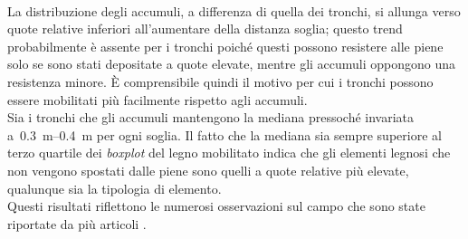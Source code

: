 %
\\
La distribuzione degli accumuli, a differenza di quella dei tronchi, si allunga verso quote relative inferiori all'aumentare della distanza soglia; questo trend probabilmente è assente per i tronchi poiché questi possono resistere alle piene solo se sono stati depositate a quote elevate, mentre gli accumuli oppongono una resistenza minore.
È comprensibile quindi il motivo per cui i tronchi possono essere mobilitati più facilmente rispetto agli accumuli.
\\
Sia i tronchi che gli accumuli mantengono la mediana pressoché invariata a~\SIrange[range-phrase = {-}, range-units = single]{0.3}{0.4}{\m} per ogni soglia.
Il fatto che la mediana sia sempre superiore al terzo quartile dei \emph{boxplot} del legno mobilitato indica che gli elementi legnosi che non vengono spostati dalle piene sono quelli a quote relative più elevate, qualunque sia la tipologia di elemento.
\\
Questi risultati riflettono le numerosi osservazioni sul campo che sono state riportate da più articoli .

